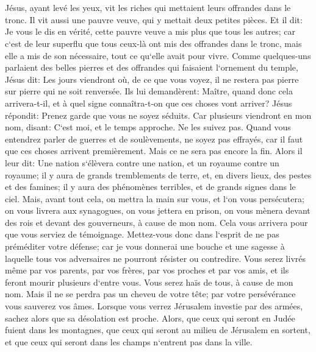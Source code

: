 \chapter{}

\verse Jésus, ayant levé les yeux, vit les riches qui mettaient leurs offrandes dans le tronc. 
\verse Il vit aussi une pauvre veuve, qui y mettait deux petites pièces. 
\verse Et il dit: Je vous le dis en vérité, cette pauvre veuve a mis plus que tous les autres; 
\verse car c`est de leur superflu que tous ceux-là ont mis des offrandes dans le tronc, mais elle a mis de son nécessaire, tout ce qu`elle avait pour vivre. 
\verse Comme quelques-uns parlaient des belles pierres et des offrandes qui faisaient l`ornement du temple, Jésus dit: 
\verse Les jours viendront où, de ce que vous voyez, il ne restera pas pierre sur pierre qui ne soit renversée. 
\verse Ils lui demandèrent: Maître, quand donc cela arrivera-t-il, et à quel signe connaîtra-t-on que ces choses vont arriver? 
\verse Jésus répondit: Prenez garde que vous ne soyez séduits. Car plusieurs viendront en mon nom, disant: C`est moi, et le temps approche. Ne les suivez pas. 
\verse Quand vous entendrez parler de guerres et de soulèvements, ne soyez pas effrayés, car il faut que ces choses arrivent premièrement. Mais ce ne sera pas encore la fin. 
\verse Alors il leur dit: Une nation s`élèvera contre une nation, et un royaume contre un royaume; 
\verse il y aura de grands tremblements de terre, et, en divers lieux, des pestes et des famines; il y aura des phénomènes terribles, et de grands signes dans le ciel. 
\verse Mais, avant tout cela, on mettra la main sur vous, et l`on vous persécutera; on vous livrera aux synagogues, on vous jettera en prison, on vous mènera devant des rois et devant des gouverneurs, à cause de mon nom. 
\verse Cela vous arrivera pour que vous serviez de témoignage. 
\verse Mettez-vous donc dans l`esprit de ne pas préméditer votre défense; 
\verse car je vous donnerai une bouche et une sagesse à laquelle tous vos adversaires ne pourront résister ou contredire. 
\verse Vous serez livrés même par vos parents, par vos frères, par vos proches et par vos amis, et ils feront mourir plusieurs d`entre vous. 
\verse Vous serez haïs de tous, à cause de mon nom. 
\verse Mais il ne se perdra pas un cheveu de votre tête; 
\verse par votre persévérance vous sauverez vos âmes. 
\verse Lorsque vous verrez Jérusalem investie par des armées, sachez alors que sa désolation est proche. 
\verse Alors, que ceux qui seront en Judée fuient dans les montagnes, que ceux qui seront au milieu de Jérusalem en sortent, et que ceux qui seront dans les champs n`entrent pas dans la ville. 
